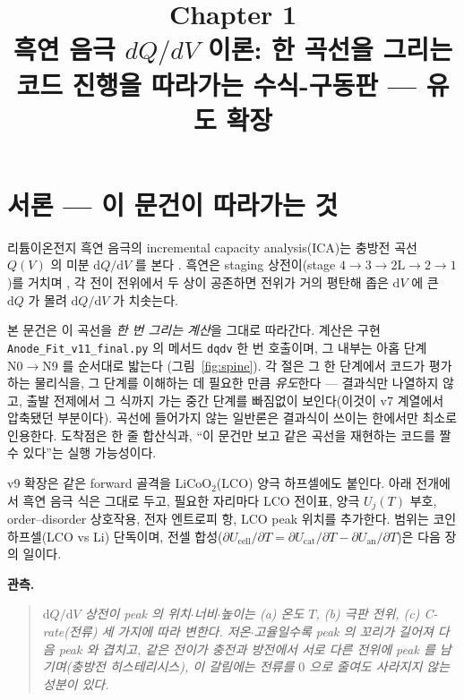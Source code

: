 \documentclass[11pt,a4paper]{article}
\title{\textbf{\LARGE Chapter 1}\\[0.35em]\Large 흑연 음극 $dQ/dV$ 이론: 한 곡선을 그리는 코드 진행을 따라가는 수식-구동판 — 유도 확장}
\author{}
\date{}
\newcommand{\dd}{\mathrm{d}}
\newcommand{\cell}{\mathrm{cell}}
\newcommand{\cat}{\mathrm{cat}}
\newcommand{\an}{\mathrm{an}}
\newcommand{\code}[1]{\texttt{#1}}
\begin{document}
\maketitle

\section*{서론 — 이 문건이 따라가는 것}
리튬이온전지 흑연 음극의 incremental capacity analysis(ICA)는 충방전 곡선 $Q(V)$ 의 미분
$\dd Q/\dd V$ 를 본다 \cite{bloom2005,dubarry2012}. 흑연은 staging 상전이(stage
$4\!\to\!3\!\to\!2\mathrm L\!\to\!2\!\to\!1$)를 거치며 \cite{dahn1991,ohzuku1993}, 각 전이 전위에서
두 상이 공존하면 전위가 거의 평탄해 좁은 $\dd V$ 에 큰 $\dd Q$ 가 몰려 $\dd Q/\dd V$ 가 치솟는다.

본 문건은 이 곡선을 \emph{한 번 그리는 계산}을 그대로 따라간다. 계산은 구현 \code{Anode\_Fit\_v11\_final.py}
의 메서드 \code{dqdv} 한 번 호출이며, 그 내부는 아홉 단계 $\mathrm N0\!\to\!\mathrm N9$ 를 순서대로 밟는다
(그림~\ref{fig:spine}). 각 절은 그 한 단계에서 코드가 평가하는 물리식을, 그 단계를 이해하는 데 필요한 만큼
\emph{유도}한다 — 결과식만 나열하지 않고, 출발 전제에서 그 식까지 가는 중간 단계를 빠짐없이 보인다(이것이 v7
계열에서 압축됐던 부분이다). 곡선에 들어가지 않는 일반론은 결과식이 쓰이는 한에서만 최소로 인용한다. 도착점은 한 줄
합산식과, ``이 문건만 보고 같은 곡선을 재현하는 코드를 짤 수 있다''는 실행 가능성이다.

v9 확장은 같은 forward 골격을 LiCoO$_2$(LCO) 양극 하프셀에도 붙인다. 아래 전개에서 흑연 음극 식은 그대로 두고,
필요한 자리마다 LCO 전이표, 양극 $U_j(T)$ 부호, order--disorder 상호작용, 전자 엔트로피 항, LCO peak 위치를
추가한다. 범위는 코인 하프셀(LCO vs Li) 단독이며, 전셀 합성($\partial U_\cell/\partial T=\partial U_\cat/\partial T-
\partial U_\an/\partial T$)은 다음 장의 일이다.

\textbf{관측.}
\begin{quote}\itshape
$\dd Q/\dd V$ 상전이 peak 의 위치$\cdot$너비$\cdot$높이는 (a) 온도 $T$, (b) 극판 전위, (c) C-rate(전류)
세 가지에 따라 변한다. 저온$\cdot$고율일수록 peak 의 꼬리가 길어져 다음 peak 와 겹치고, 같은 전이가 충전과 방전에서
서로 다른 전위에 peak 를 남기며(충방전 히스테리시스), 이 갈림에는 전류를 $0$ 으로 줄여도 사라지지 않는 성분이 있다.
\end{quote}
\end{document}
